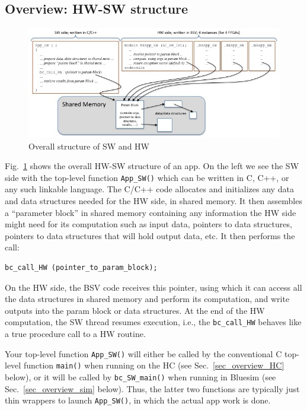 \documentclass[twoside,letterpaper,11pt]{article}
\begin{document}
\subsection{Overview: HW-SW structure}

\begin{figure}[htbp]
  \centerline{\includegraphics[width=6.5in,angle=0]{Figures/Fig_HW_SW_structure}}
  \caption{\label{Fig_HW_SW_structure}Overall structure of SW and HW}
\end{figure}
Fig.~\ref{Fig_HW_SW_structure} shows the overall HW-SW structure of an
app.  On the left we see the SW side with the top-level function
\verb|App_SW()| which can be written in C, C++, or any such linkable
language.
The C/C++ code allocates and initializes any data and data structures
needed for the HW side, in shared memory.  It then assembles a
``parameter block'' in shared memory containing any information the HW
side might need for its computation such as input data, pointers to
data structures, pointers to data structures that will hold output
data, etc.  It then performs the call:
\begin{Verbatim}[frame=single] 
    bc_call_HW (pointer_to_param_block);
\end{Verbatim}
On the HW side, the BSV code receives this pointer, using which it can
access all the data structures in shared memory and perform its
computation, and write outputs into the param block or data
structures.  At the end of the HW computation, the SW thread resumes
execution, i.e., the \verb|bc_call_HW| behaves like a true procedure
call to a HW routine.

Your top-level function \verb|App_SW()| will either be called by the
conventional C top-level function \verb|main()| when running on the HC
(see Sec.~\ref{sec_overview_HC} below), or it will be called by
\verb|bc_SW_main()| when running in Bluesim (see
Sec.~\ref{sec_overview_sim} below).  Thus, the latter two functions
are typically just thin wrappers to launch \verb|App_SW()|, in which
the actual app work is done.
\end{document}
